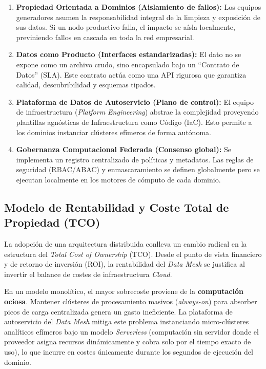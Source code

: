 \documentclass[12pt, a4paper]{article}
\begin{document}
\begin{enumerate}
    \item \textbf{Propiedad Orientada a Dominios (Aislamiento de fallos):} Los equipos generadores asumen la responsabilidad integral de la limpieza y exposición de sus datos. Si un nodo productivo falla, el impacto se aísla localmente, previniendo fallos en cascada en toda la red empresarial.
    \item \textbf{Datos como Producto (Interfaces estandarizadas):} El dato no se expone como un archivo crudo, sino encapsulado bajo un ``Contrato de Datos'' (SLA). Este contrato actúa como una API rigurosa que garantiza calidad, descubribilidad y esquemas tipados.
    \item \textbf{Plataforma de Datos de Autoservicio (Plano de control):} El equipo de infraestructura (\textit{Platform Engineering}) abstrae la complejidad proveyendo plantillas agnósticas de Infraestructura como Código (IaC). Esto permite a los dominios instanciar clústeres efímeros de forma autónoma.
    \item \textbf{Gobernanza Computacional Federada (Consenso global):} Se implementa un registro centralizado de políticas y metadatos. Las reglas de seguridad (RBAC/ABAC) y enmascaramiento se definen globalmente pero se ejecutan localmente en los motores de cómputo de cada dominio.
\end{enumerate}

\subsection{Modelo de Rentabilidad y Coste Total de Propiedad (TCO)}

La adopción de una arquitectura distribuida conlleva un cambio radical en la estructura del \textit{Total Cost of Ownership} (TCO). Desde el punto de vista financiero y de retorno de inversión (ROI), la rentabilidad del \textit{Data Mesh} se justifica al invertir el balance de costes de infraestructura \textit{Cloud}.

En un modelo monolítico, el mayor sobrecoste proviene de la \textbf{computación ociosa}. Mantener clústeres de procesamiento masivos (\textit{always-on}) para absorber picos de carga centralizada genera un gasto ineficiente. La plataforma de autoservicio del \textit{Data Mesh} mitiga este problema instanciando micro-clústeres analíticos efímeros bajo un modelo \textit{Serverless} (computación sin servidor donde el proveedor asigna recursos dinámicamente y cobra solo por el tiempo exacto de uso), lo que incurre en costes únicamente durante los segundos de ejecución del dominio.
\end{document}

